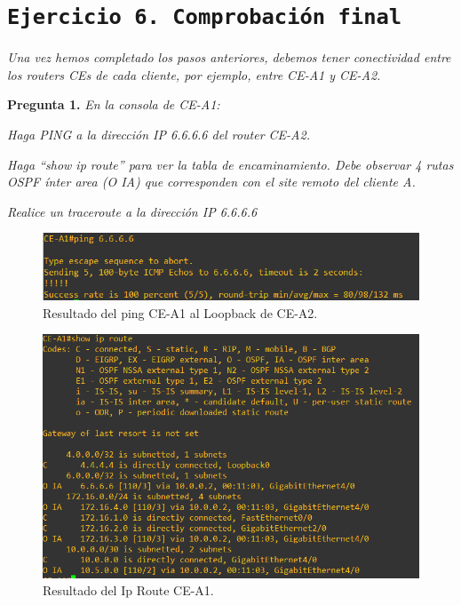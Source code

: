 \documentclass[a4paper, 12pt]{report}
\begin{document}
\newpage
\section{\texttt{Ejercicio 6. Comprobación final}}

\textit{Una vez hemos completado los pasos anteriores, debemos tener conectividad entre los routers
CEs de cada cliente, por ejemplo, entre CE-A1 y CE-A2.}

\textbf{Pregunta 1.}
\textit{En la consola de CE-A1:}

\textit{Haga PING a la dirección IP 6.6.6.6 del router CE-A2.}

\textit{Haga “show ip route” para ver la tabla de encaminamiento. Debe observar 4 rutas OSPF
ínter area (O IA) que corresponden con el site remoto del cliente A.}

\textit{Realice un traceroute a la dirección IP 6.6.6.6}

\begin{figure}[H]
	\centering
	\includegraphics[scale=0.6]{ping6666.png}
	\caption{Resultado del ping CE-A1 al Loopback de CE-A2.}
	\label{fig:ping6666}
\end{figure}

\begin{figure}[H]
	\centering
	\includegraphics[scale=0.6]{showiproutea1.png}
	\caption{Resultado del Ip Route CE-A1.}
	\label{fig:showiproutea1}
\end{figure}
\end{document}
